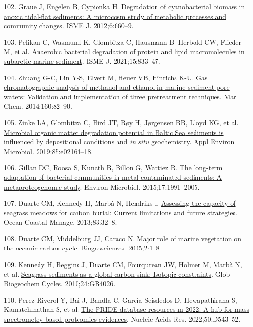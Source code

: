 \documentclass[
  12 pt,
]{article}
\newlength{\cslhangindent}
\newlength{\cslentryspacingunit} %
\newenvironment{CSLReferences}[2] %
 {%
  \setlength{\parindent}{0pt}
  \ifodd #1
  \let\oldpar\par
  \def\par{\hangindent=\cslhangindent\oldpar}
  \fi
  \setlength{\parskip}{#2\cslentryspacingunit}
 }%
 {}
\begin{document}
\begin{CSLReferences}{0}{0}
\leavevmode{}%
102. Graue J, Engelen B, Cypionka H. \href{https://doi.org/10.1038/ismej.2011.120}{Degradation of cyanobacterial biomass in anoxic tidal-flat sediments: A microcosm study of metabolic processes and community changes}. ISME J. 2012;6:660--9.

\leavevmode{}%
103. Pelikan C, Wasmund K, Glombitza C, Hausmann B, Herbold CW, Flieder M, et al. \href{https://doi.org/10.1038/s41396-020-00817-6}{Anaerobic bacterial degradation of protein and lipid macromolecules in subarctic marine sediment}. ISME J. 2021;15:833--47.

\leavevmode{}%
104. Zhuang G-C, Lin Y-S, Elvert M, Heuer VB, Hinrichs K-U. \href{https://doi.org/10.1016/j.marchem.2014.01.011}{Gas chromatographic analysis of methanol and ethanol in marine sediment pore waters: Validation and implementation of three pretreatment techniques}. Mar Chem. 2014;160:82--90.

\leavevmode{}%
105. Zinke LA, Glombitza C, Bird JT, Røy H, Jørgensen BB, Lloyd KG, et al. \href{https://doi.org/10.1128/AEM.02164-18}{Microbial organic matter degradation potential in {Baltic Sea} sediments is influenced by depositional conditions and {{\emph{in situ}}} geochemistry}. Appl Environ Microbiol. 2019;85:e02164--18.

\leavevmode{}%
106. Gillan DC, Roosa S, Kunath B, Billon G, Wattiez R. \href{https://doi.org/10.1111/1462-2920.12627}{The long-term adaptation of bacterial communities in metal-contaminated sediments: A metaproteogenomic study}. Environ Microbiol. 2015;17:1991--2005.

\leavevmode{}%
107. Duarte CM, Kennedy H, Marbà N, Hendriks I. \href{https://doi.org/10.1016/j.ocecoaman.2011.09.001}{Assessing the capacity of seagrass meadows for carbon burial: Current limitations and future strategies}. Ocean Coastal Manage. 2013;83:32--8.

\leavevmode{}%
108. Duarte CM, Middelburg JJ, Caraco N. \href{https://doi.org/10.5194/bg-2-1-2005}{Major role of marine vegetation on the oceanic carbon cycle}. Biogeosciences. 2005;2:1--8.

\leavevmode{}%
109. Kennedy H, Beggins J, Duarte CM, Fourqurean JW, Holmer M, Marbà N, et al. \href{https://doi.org/10.1029/2010GB003848}{Seagrass sediments as a global carbon sink: Isotopic constraints}. Glob Biogeochem Cycles. 2010;24:GB4026.

\leavevmode{}%
110. Perez-Riverol Y, Bai J, Bandla C, García-Seisdedos D, Hewapathirana S, Kamatchinathan S, et al. \href{https://doi.org/10.1093/nar/gkab1038}{The {PRIDE} database resources in 2022: A hub for mass spectrometry-based proteomics evidences}. Nucleic Acids Res. 2022;50:D543--52.

\end{CSLReferences}
\end{document}
